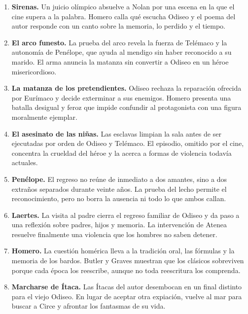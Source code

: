 \documentclass[11pt,a4paper]{article}
\begin{document}
\begin{enumerate}[label=\Roman*.,leftmargin=3.2em,itemsep=0.7em]
\item \textbf{Sirenas.}
Un juicio olímpico absuelve a Nolan por una escena en la que el cine supera a
la palabra. Homero calla qué escucha Odiseo y el poema del autor responde con
un canto sobre la memoria, lo perdido y el tiempo.

\item \textbf{El arco funesto.}
La prueba del arco revela la fuerza de Telémaco y la autonomía de Penélope,
que ayuda al mendigo sin haber reconocido a su marido. El arma anuncia la
matanza sin convertir a Odiseo en un héroe misericordioso.

\item \textbf{La matanza de los pretendientes.}
Odiseo rechaza la reparación ofrecida por Eurímaco y decide exterminar a sus
enemigos. Homero presenta una batalla desigual y feroz que impide confundir al
protagonista con una figura moralmente ejemplar.

\item \textbf{El asesinato de las niñas.}
Las esclavas limpian la sala antes de ser ejecutadas por orden de Odiseo y
Telémaco. El episodio, omitido por el cine, concentra la crueldad del héroe y
la acerca a formas de violencia todavía actuales.

\item \textbf{Penélope.}
El regreso no reúne de inmediato a dos amantes, sino a dos extraños separados
durante veinte años. La prueba del lecho permite el reconocimiento, pero no
borra la ausencia ni todo lo que ambos callan.

\item \textbf{Laertes.}
La visita al padre cierra el regreso familiar de Odiseo y da paso a una
reflexión sobre padres, hijos y memoria. La intervención de Atenea resuelve
finalmente una violencia que los hombres no saben detener.

\item \textbf{Homero.}
La cuestión homérica lleva a la tradición oral, las fórmulas y la memoria de
los bardos. Butler y Graves muestran que los clásicos sobreviven porque cada
época los reescribe, aunque no toda reescritura los comprenda.

\item \textbf{Marcharse de Ítaca.}
Las Ítacas del autor desembocan en un final distinto para el viejo Odiseo. En
lugar de aceptar otra expiación, vuelve al mar para buscar a Circe y afrontar
los fantasmas de su vida.

\end{enumerate}
\end{document}
